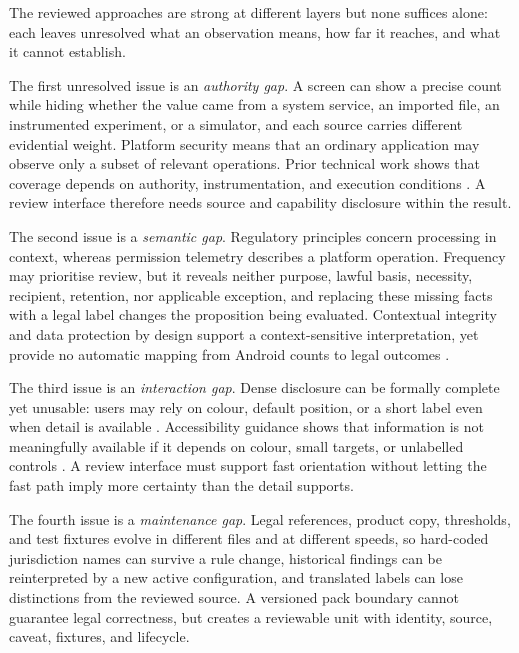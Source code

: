 The reviewed approaches are strong at different layers but none suffices alone: each leaves unresolved what an observation means, how far it reaches, and what it cannot establish.

The first unresolved issue is an \emph{authority gap}. A screen can show a precise count while hiding whether the value came from a system service, an imported file, an instrumented experiment, or a simulator, and each source carries different evidential weight. Platform security means that an ordinary application may observe only a subset of relevant operations. Prior technical work shows that coverage depends on authority, instrumentation, and execution conditions \cite{egele2011,androidPermissions}. A review interface therefore needs source and capability disclosure within the result.

The second issue is a \emph{semantic gap}. Regulatory principles concern processing in context, whereas permission telemetry describes a platform operation. Frequency may prioritise review, but it reveals neither purpose, lawful basis, necessity, recipient, retention, nor applicable exception, and replacing these missing facts with a legal label changes the proposition being evaluated. Contextual integrity and data protection by design support a context-sensitive interpretation, yet provide no automatic mapping from Android counts to legal outcomes \cite{nissenbaum2011,gdpr2016,edpbArticle25}.

The third issue is an \emph{interaction gap}. Dense disclosure can be formally complete yet unusable: users may rely on colour, default position, or a short label even when detail is available \cite{sweller2011,kahneman2011}. Accessibility guidance shows that information is not meaningfully available if it depends on colour, small targets, or unlabelled controls \cite{wcag22,androidAccessibility}. A review interface must support fast orientation without letting the fast path imply more certainty than the detail supports.

The fourth issue is a \emph{maintenance gap}. Legal references, product copy, thresholds, and test fixtures evolve in different files and at different speeds, so hard-coded jurisdiction names can survive a rule change, historical findings can be reinterpreted by a new active configuration, and translated labels can lose distinctions from the reviewed source. A versioned pack boundary cannot guarantee legal correctness, but creates a reviewable unit with identity, source, caveat, fixtures, and lifecycle.

